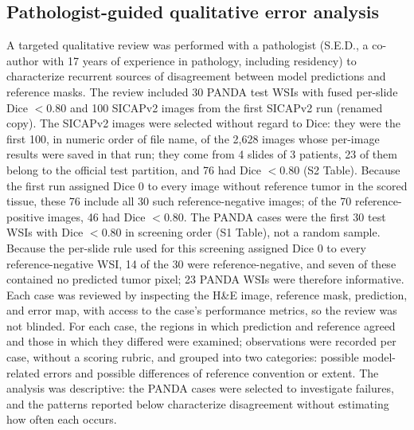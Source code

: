 \documentclass[10pt,letterpaper]{article}
\begin{document}
\subsection*{Pathologist-guided qualitative error analysis}
A targeted qualitative review was performed with a pathologist (S.E.D., a co-author with 17 years of experience in pathology, including residency) to characterize recurrent sources of disagreement between model predictions and reference masks. The review included 30 PANDA test WSIs with fused per-slide Dice $<0.80$ and 100 SICAPv2 images from the first SICAPv2 run (renamed copy). The SICAPv2 images were selected without regard to Dice: they were the first 100, in numeric order of file name, of the 2,628 images whose per-image results were saved in that run; they come from 4 slides of 3 patients, 23 of them belong to the official test partition, and 76 had Dice $<0.80$ (S2 Table). Because the first run assigned Dice 0 to every image without reference tumor in the scored tissue, these 76 include all 30 such reference-negative images; of the 70 reference-positive images, 46 had Dice $<0.80$. The PANDA cases were the first 30 test WSIs with Dice $<0.80$ in screening order (S1 Table), not a random sample. Because the per-slide rule used for this screening assigned Dice 0 to every reference-negative WSI, 14 of the 30 were reference-negative, and seven of these contained no predicted tumor pixel; 23 PANDA WSIs were therefore informative. Each case was reviewed by inspecting the H\&E image, reference mask, prediction, and error map, with access to the case's performance metrics, so the review was not blinded. For each case, the regions in which prediction and reference agreed and those in which they differed were examined; observations were recorded per case, without a scoring rubric, and grouped into two categories: possible model-related errors and possible differences of reference convention or extent. The analysis was descriptive: the PANDA cases were selected to investigate failures, and the patterns reported below characterize disagreement without estimating how often each occurs.
\end{document}
